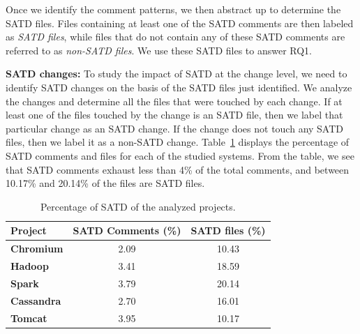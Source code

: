 Once we identify the comment patterns, we then abstract up to determine the SATD files. Files containing at least one of the SATD comments are then labeled as {\em SATD files}, while files that do not contain any of these SATD comments are referred to as {\em non-SATD files}. We use these SATD files to answer RQ1.

\noindent\textbf{SATD changes:}
To study the impact of SATD at the change level, we need to identify SATD changes on the basis of the SATD files just identified. We analyze the changes and determine all the files that were touched by each change. If at least one of the files touched by the change is an SATD file, then we label that particular change as an SATD change. If the change does not touch any SATD files, then we label it as a non-SATD change. Table~\ref{table:satd_analyzed_projects} displays the percentage of SATD comments and files for each of the studied systems. From the table, we see that SATD comments exhaust less than 4\% of the total comments, and between 10.17\% and 20.14\% of the files are SATD files.

\begin{table}[tbh]
	\setlength{\tabcolsep}{.7\tabcolsep}
	\centering
	\caption{Percentage of SATD of the analyzed projects.}
	\begin{tabular}{l|c|c}
		\hline
		\textbf{Project}   & \textbf{SATD Comments (\%)} & \textbf{SATD files (\%)} \\ \hline
		\textbf{Chromium}  & 2.09             & 10.43                             \\ \hline
		\textbf{Hadoop}    & 3.41             & 18.59                             \\ \hline
		\textbf{Spark}     & 3.79             & 20.14                             \\ \hline
		\textbf{Cassandra} & 2.70             & 16.01                             \\ \hline
		\textbf{Tomcat}    & 3.95             & 10.17                             \\ \hline
	\end{tabular}
	\label{table:satd_analyzed_projects}
	\vspace{-0.2cm}
\end{table}


